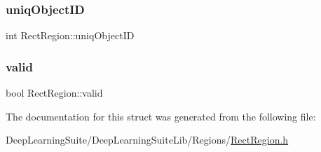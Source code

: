 \subsubsection{\texorpdfstring{uniq\+Object\+ID}{uniqObjectID}}
{\footnotesize\ttfamily int Rect\+Region\+::uniq\+Object\+ID}

\mbox{\label{struct_rect_region_ae322b2513067e035048a88e2fa911455}} 
\subsubsection{\texorpdfstring{valid}{valid}}
{\footnotesize\ttfamily bool Rect\+Region\+::valid}



The documentation for this struct was generated from the following file\+:\begin{DoxyCompactItemize}
\item 
Deep\+Learning\+Suite/\+Deep\+Learning\+Suite\+Lib/\+Regions/\hyperlink{_rect_region_8h}{Rect\+Region.\+h}\end{DoxyCompactItemize}
